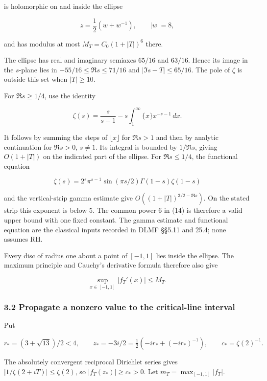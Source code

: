 is holomorphic on and inside the ellipse

\[
 z=\frac12(w+w^{-1}),\qquad |w|=8,
                                                                         \tag{15}
\]

and has modulus at most \(M_T=C_0(1+|T|)^6\) there.

The ellipse has real and imaginary semiaxes \(65/16\) and \(63/16\). Hence its image in the \(s\)-plane lies in \(-55/16\le\Re s\le71/16\) and \(|\Im s-T|\le65/16\). The pole of \(\zeta\) is outside this set when \(|T|\ge10\).

For \(\Re s\ge1/4\), use the identity

\[
 \zeta(s)=\frac{s}{s-1}-s\int_1^\infty\{x\}x^{-s-1}\,dx.              \tag{16}
\]

It follows by summing the steps of \(\lfloor x\rfloor\) for \(\Re s>1\) and then by analytic continuation for \(\Re s>0\), \(s\ne1\). Its integral is bounded by \(1/\Re s\), giving \(O(1+|T|)\) on the indicated part of the ellipse. For \(\Re s\le1/4\), the functional equation

\[
 \zeta(s)=2^s\pi^{s-1}\sin(\pi s/2)\Gamma(1-s)\zeta(1-s)              \tag{17}
\]

and the vertical-strip gamma estimate give \(O((1+|T|)^{3/2-\Re s})\). On the stated strip this exponent is below \(5\). The common power \(6\) in (14) is therefore a valid upper bound with one fixed constant. The gamma estimate and functional equation are the classical inputs recorded in DLMF §§5.11 and 25.4; none assumes RH.

Every disc of radius one about a point of \([-1,1]\) lies inside the ellipse. The maximum principle and Cauchy's derivative formula therefore also give

\[
 \sup_{x\in[-1,1]}|f_T'(x)|\le M_T.                                    \tag{18}
\]

\subsubsection{3.2 Propagate a nonzero value to the critical-line interval}\label{zlm:endpoint-arithmetic_original--propagate-a-nonzero-value-to-the-critical-line-interval}

Put

\[
 r_*=(3+\sqrt{13})/2<4,\qquad
 z_*=-3i/2=\tfrac12(-ir_*+(-ir_*)^{-1}),\qquad
 c_* =\zeta(2)^{-1}.                                                    \tag{19}
\]

The absolutely convergent reciprocal Dirichlet series gives \(|1/\zeta(2+iT)|\le\zeta(2)\), so \(|f_T(z_*)|\ge c_*>0\). Let \(m_T=\max_{[-1,1]}|f_T|\).

